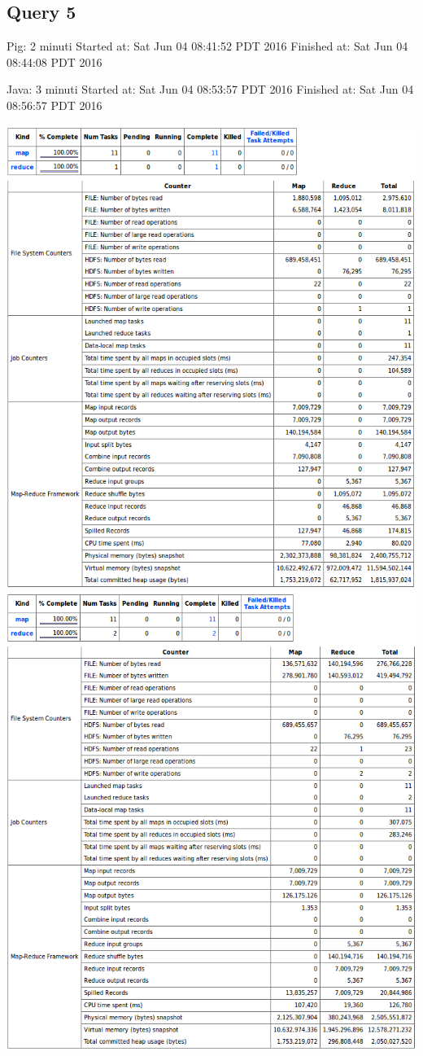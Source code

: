 \documentclass[11pt]{article} %
\begin{document}
\subsection{Query 5}
Pig:  2 minuti	Started at: Sat Jun 04 08:41:52 PDT 2016	 Finished at: Sat Jun 04 08:44:08 PDT 2016

Java: 3 minuti	Started at: Sat Jun 04 08:53:57 PDT 2016	 Finished at: Sat Jun 04 08:56:57 PDT 2016

\includegraphics[scale=0.8]{pig5.png}
\includegraphics[scale=0.8]{java5.png}
\end{document}

